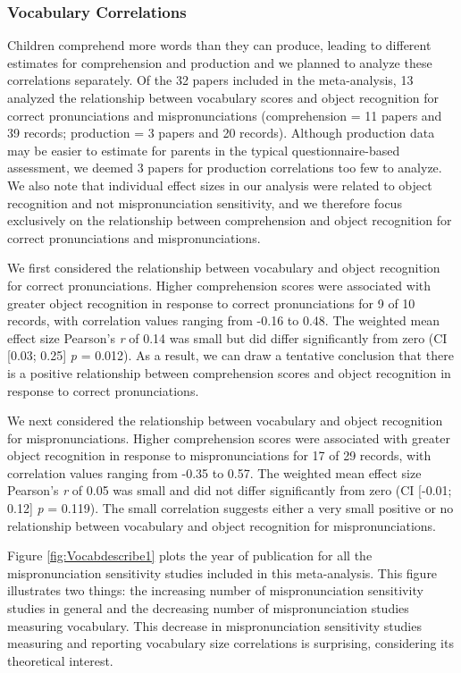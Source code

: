 \documentclass[
  english,
  man, noextraspace]{apa6}
\begin{document}
\hypertarget{vocabulary-correlations}{%
\subsubsection{Vocabulary Correlations}\label{vocabulary-correlations}}

Children comprehend more words than they can produce, leading to different estimates for comprehension and production and we planned to analyze these correlations separately. Of the 32 papers included in the meta-analysis, 13 analyzed the relationship between vocabulary scores and object recognition for correct pronunciations and mispronunciations (comprehension = 11 papers and 39 records; production = 3 papers and 20 records). Although production data may be easier to estimate for parents in the typical questionnaire-based assessment, we deemed 3 papers for production correlations too few to analyze. We also note that individual effect sizes in our analysis were related to object recognition and not mispronunciation sensitivity, and we therefore focus exclusively on the relationship between comprehension and object recognition for correct pronunciations and mispronunciations.

We first considered the relationship between vocabulary and object recognition for correct pronunciations. Higher comprehension scores were associated with greater object recognition in response to correct pronunciations for 9 of 10 records, with correlation values ranging from -0.16 to 0.48. The weighted mean effect size Pearson's \emph{r} of 0.14 was small but did differ significantly from zero (CI {[}0.03; 0.25{]} \emph{p} = 0.012). As a result, we can draw a tentative conclusion that there is a positive relationship between comprehension scores and object recognition in response to correct pronunciations.

We next considered the relationship between vocabulary and object recognition for mispronunciations. Higher comprehension scores were associated with greater object recognition in response to mispronunciations for 17 of 29 records, with correlation values ranging from -0.35 to 0.57. The weighted mean effect size Pearson's \emph{r} of 0.05 was small and did not differ significantly from zero (CI {[}-0.01; 0.12{]} \emph{p} = 0.119). The small correlation suggests either a very small positive or no relationship between vocabulary and object recognition for mispronunciations.

Figure \ref{fig:Vocabdescribe1} plots the year of publication for all the mispronunciation sensitivity studies included in this meta-analysis. This figure illustrates two things: the increasing number of mispronunciation sensitivity studies in general and the decreasing number of mispronunciation studies measuring vocabulary. This decrease in mispronunciation sensitivity studies measuring and reporting vocabulary size correlations is surprising, considering its theoretical interest.
\end{document}
